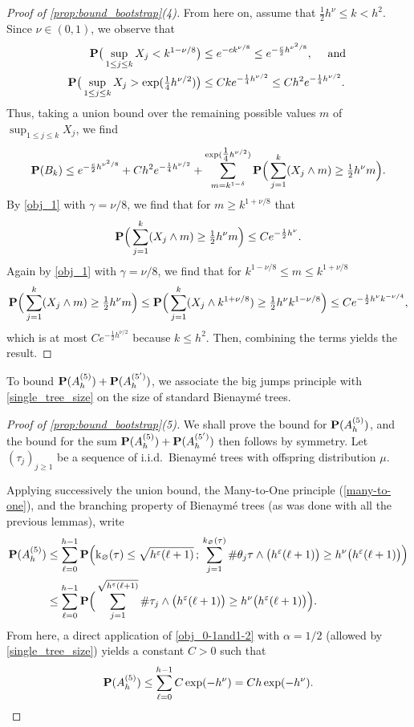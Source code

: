 \documentclass[11pt,reqno]{amsart}
\newcommand{\rk}{\mathrm{k}}
\renewcommand{\emptyset}{\varnothing}
\begin{document}
\begin{proof}[Proof of \cref{prop:bound_bootstrap}(4)]
    From here on, assume that $\tfrac{1}{2}h^\nu \le k <h^{2}$. Since $\nu\in(0,1)$, we observe that 
    \begin{align*}
    \mathbf{P}\big(\sup_{1\le j \le k}X_j<k^{1-\nu/8}\big) &\le e^{-ck^{\nu/8}}\le e^{-\frac{c}{2}h^{\nu^2 /8}}, \quad\text{ and }\\
    \mathbf{P}\big(\sup_{1\le j \le k}X_j>\exp(\tfrac14 h^{\nu/2})\big) &\le C k e^{ - \frac{1}{4}h^{\nu/2}} \le C h^{2} e^{ - \frac{1}{4}h^{\nu/2}}.
    \end{align*}
    Thus, taking a union bound over the remaining possible values $m$ of $\sup_{1\le j \le k}X_j$, we find 
    \[\mathbf{P}(B_k)\le e^{-\frac{c}{2}h^{\nu^2/8 }}+ C h^{2} e^{ - \frac{1}{4}h^{\nu/2}} + \sum_{m=k^{1-\delta}}^{\exp(\tfrac14 h^{\nu/2})} \mathbf{P}\Big(\sum_{j=1}^k (X_j \wedge m) \ge \tfrac{1}{2}h^\nu m \Big). \]
    By \cref{obj_1} with $\gamma=\nu/8$, we find that for $m\ge k^{1+\nu/8}$ that 
    \[\mathbf{P}\Big(\sum_{j=1}^k (X_j \wedge m) \ge \tfrac{1}{2}h^\nu m  \Big)\le Ce^{-\frac{1}{2}h^\nu}.\]
    Again by \cref{obj_1} with $\gamma=\nu/8$, we find that for $k^{1-\nu/8}\le m\le k^{1+\nu/8}$ 
    \[\mathbf{P}\Big(\sum_{j=1}^k (X_j \wedge m) \ge \tfrac{1}{2} h^\nu m  \Big) \le \mathbf{P}\Big(\sum_{j=1}^k (X_j \wedge k^{1+\nu/8}) \ge \tfrac{1}{2}h^\nu k^{1-\nu/8}  \Big)\le Ce^{-\frac{1}{2}h^\nu k^{-\nu/4}},\] 
    which is at most $Ce^{-\frac{1}{2}h^{\nu/2}}$ because $k\le h^2$. Then, combining the terms yields the result. 
\end{proof}


To bound $\mathbf{P}(A_h^{(5)})+\mathbf{P}(A_{h}^{(5')})$, we associate the big jumps principle with \cref{single_tree_size} on the size of standard Bienaymé trees.

\begin{proof}[Proof of \cref{prop:bound_bootstrap}(5)]
   
    We shall prove the bound for $\mathbf{P}(A_{h}^{(5)})$, and the bound for the sum $\mathbf{P}(A_{h}^{(5)})+\mathbf{P}(A_{h}^{(5')})$ then follows by symmetry. Let $(\tau_j)_{j\geq 1}$ be a sequence of i.i.d.~Bienaym\'{e} trees with offspring distribution $\mu$.
    
    Applying successively the union bound, the Many-to-One principle (\cref{many-to-one}), and the branching property of Bienaymé trees (as was done with all the previous lemmas), write
    \begin{align*}
    \prob(A_{h}^{(5)}) &\leq \sum_{\ell = 0}^{h-1} \prob\Big( \rk_\emptyset(\tau) \leq \sqrt{h^\varepsilon(\ell+1)}\, ;\, \sum_{j=1}^{k_\emptyset(\tau)} \# \theta_j\tau \wedge \big(h^\varepsilon (\ell+1)\big) \geq h^\nu \big(h^\varepsilon (\ell+1)\big)\Big)\\
    &\leq \sum_{\ell = 0}^{h-1} \prob\Big( \sum_{j=1}^{\sqrt{h^\varepsilon(\ell+1)}} \# \tau_j \wedge \big(h^\varepsilon (\ell+1)\big) \geq h^\nu \big(h^\varepsilon (\ell+1)\big)\Big).
    \end{align*}
    From here, a direct application of \cref{obj_0-1and1-2} with $\alpha=1/2$ (allowed by \cref{single_tree_size}) yields a constant $C > 0$ such that
    \[\mathbf{P}(A_{h}^{(5)}) \leq \sum_{\ell = 0}^{h-1} C\exp(-h^\nu) = Ch\exp(-h^\nu). \qedhere\]
\end{proof}
\end{document}
